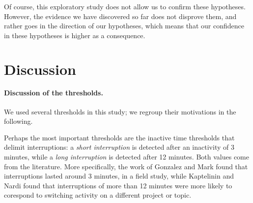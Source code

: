 \documentclass[times]{smrauth}
\begin{document}

Of course, this exploratory study does not allow us to confirm these hypotheses. However, the evidence we have discovered so far does not disprove them, and rather goes in the direction of our hypotheses, which means that our confidence in these hypotheses is higher as a consequence.



\section{Discussion}

\paragraph{Discussion of the thresholds.} We used several thresholds in this study; we regroup their motivations in the following. 


Perhaps the most important thresholds are the inactive time thresholds that delimit interruptions: a \emph{short interruption} is detected after an inactivity of 3 minutes, while a \emph{long interruption} is detected after 12 minutes. Both values come from the literature. More specifically, the work of Gonzalez and Mark \cite{GM04} found that interruptions lasted around 3 minutes, in a field study, while Kaptelinin and Nardi \cite{KaptelininN07} found that interruptions of more than 12 minutes were more likely to corespond to switching activity on a different project or topic.
\end{document}
